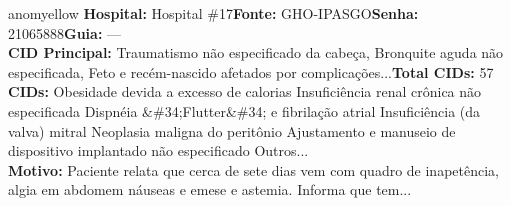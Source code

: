 \documentclass[a4paper,10pt]{article}
\begin{document}
\begin{anomalycard}[Interna\c{c}\~{a}o \#184 | Pac. \#238 | MODERADO (z=2.92) | LOS: 16d | 07/03/2026\,$\to$\,—]{anomyellow}
\textbf{Hospital:} Hospital \#17\quad \textbf{Fonte:} GHO-IPASGO\quad \textbf{Senha:} 21065888\quad \textbf{Guia:} ---\\

\textbf{CID Principal:} {\small Traumatismo não especificado da cabeça, Bronquite aguda não especificada, Feto e recém-nascido afetados por complicações...}\quad\textbf{Total CIDs:} 57\\

\textbf{CIDs:} {\scriptsize Obesidade devida a excesso de calorias \textbar{} Insuficiência renal crônica não especificada \textbar{} Dispnéia \textbar{} \&\#34;Flutter\&\#34; e fibrilação atrial \textbar{} Insuficiência (da valva) mitral \textbar{} Neoplasia maligna do peritônio \textbar{} Ajustamento e manuseio de dispositivo implantado não especificado \textbar{} Outros...}\\

\textbf{Motivo:} {\scriptsize Paciente relata que cerca de sete dias vem com quadro de inapetência,  algia em abdomem náuseas e emese e astemia. Informa que tem...}\\




\end{anomalycard}
\end{document}
